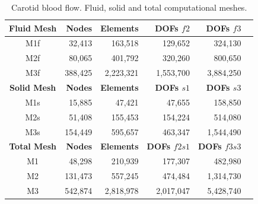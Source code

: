 \documentclass[11pt,english]{article}
\begin{document}
\begin{table}[h]
    \centering
        \begin{tabular}{crrrrr}
           \toprule
           \textbf{Fluid Mesh} &  \textbf{Nodes} &  \textbf{Elements} & \textbf{DOFs $f2$} & \textbf{DOFs $f3$} \\
           \midrule
           M1f & 32,413  & 163,518   & 129,652   & 324,130 \\
           M2f & 80,065  & 401,792   & 320,260   & 800,650 \\ 
           M3f & 388,425 & 2,223,321 & 1,553,700 & 3,884,250  \\
           \bottomrule
           \toprule
           \textbf{Solid Mesh} &  \textbf{Nodes} &  \textbf{Elements} & \textbf{DOFs $s1$}  & \textbf{DOFs $s3$} \\
           \midrule
           M1s & 15,885  & 47,421  & 47,655  & 158,850  \\
           M2s & 51,408  & 155,453 & 154,224 & 514,080  \\
           M3s & 154,449 & 595,657 & 463,347 & 1,544,490 \\
           \bottomrule
           \toprule
           \textbf{Total Mesh} &  \textbf{Nodes} &  \textbf{Elements} & \textbf{DOFs $f2s1$}  & \textbf{DOFs $f3s3$} \\
           \midrule
           M1 & 48,298  & 210,939 & 177,307  & 482,980 \\
           M2 & 131,473 & 557,245 & 474,484 & 1,314,730 \\
           M3 & 542,874 & 2,818,978 & 2,017,047 & 5,428,740 \\
           \bottomrule
       \end{tabular}
    \caption{Carotid blood flow. Fluid, solid and total computational meshes.}
    \label{tab:carotide_meshes}
\end{table}
\end{document}
